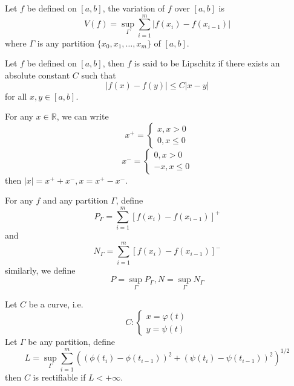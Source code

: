 \documentclass[openany]{book}
\newcommand{\R}{\mathbb{R}}
\begin{document}
\begin{defn}[variation]
    Let $f$ be defined on $[a,b]$, the variation of $f$ over $[a,b]$ is 
    \begin{equation*}
        V(f)=\sup_\Gamma\sum_{i=1}^m|f(x_i)-f(x_{i-1})|
    \end{equation*}
    where $\Gamma$ is any partition $\{x_0,x_1,\dots, x_m\}$ of $[a,b]$.
\end{defn}
\begin{defn}[Lipschitz]
    Let $f$ be defined on $[a,b]$, then $f$ is said to be Lipschitz if there exists an absolute constant $C$ such that 
    \begin{equation*}
        |f(x)-f(y)|\leq C|x-y|
    \end{equation*}
    for all $x,y\in [a,b]$.
\end{defn}
\begin{defn}[splitting]
    For any $x\in\R$, we can write 
    \begin{equation*}
        x^+=\begin{cases}
            x, x>0\\
            0, x\leq 0
        \end{cases}
    \end{equation*}
    \begin{equation*}
        x^-=\begin{cases}
            0, x>0\\
            -x, x\leq 0
        \end{cases}
    \end{equation*}
    then $|x|=x^{+}+x^{-}, x=x^{+}-x^{-}$.
\end{defn}
\begin{defn}
    For any $f$ and any partition $\Gamma$, define 
    \begin{equation*}
        P_\Gamma=\sum_{i=1}^m[f(x_i)-f(x_{i-1})]^+
    \end{equation*}
    and 
    \begin{equation*}
        N_\Gamma=\sum_{i=1}^m[f(x_i)-f(x_{i-1})]^-
    \end{equation*}
    similarly, we define 
    \begin{equation*}
        P=\sup_\Gamma P_\Gamma, N=\sup_\Gamma N_\Gamma
    \end{equation*}
\end{defn}
\begin{defn}
    Let $C$ be a curve, i.e. 
    \begin{equation*}
        C:\begin{cases}
            x=\varphi(t)\\
            y=\psi(t)
        \end{cases}
    \end{equation*}
    Let $\Gamma$ be any partition, define 
    \begin{equation*}
        L=\sup_\Gamma\sum_{i=1}^m\left((\phi(t_i)-\phi(t_{i-1}))^2+(\psi(t_i)-\psi(t_{i-1}))^2\right)^{1/2}
    \end{equation*}
    then $C$ is rectifiable if $L<+\infty$.
\end{defn}
\end{document}
